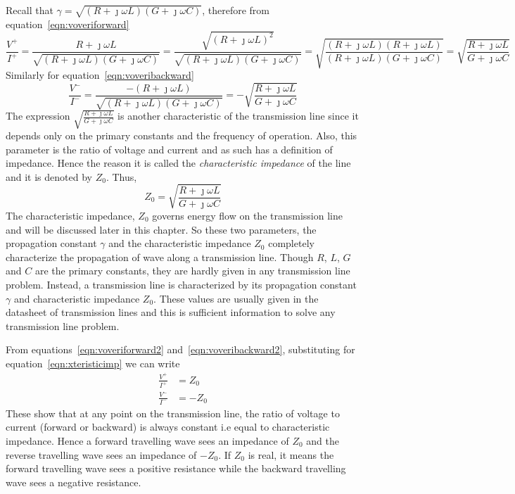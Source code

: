 Recall that $\gamma = \sqrt{(R + \jmath\omega L)(G + \jmath\omega C)}$, therefore from equation~\eqref{eqn:voveriforward}
\begin{dmath}
\frac{V^+}{I^+} = \frac{R+\jmath\omega L}{\sqrt{(R + \jmath\omega L)(G + \jmath\omega C)}}
= \frac{\sqrt{(R+\jmath\omega L)^2}}{\sqrt{(R + \jmath\omega L)(G + \jmath\omega C)}}
=\sqrt{\frac{(R+\jmath\omega L)(R+\jmath\omega L)}{(R + \jmath\omega L)(G + \jmath\omega C)}}
=\sqrt{\frac{R+\jmath\omega L}{G+\jmath\omega C}}
\label{eqn:voveriforward2}
\end{dmath}
Similarly for equation~\eqref{eqn:voveribackward}
\begin{dmath}
\frac{V^-}{I^-} = \frac{-(R+\jmath\omega L)}{\sqrt{(R + \jmath\omega L)(G + \jmath\omega C)}}
=-\sqrt{\frac{R+\jmath\omega L}{G+\jmath\omega C}}
\label{eqn:voveribackward2}
\end{dmath}
The expression $\sqrt{\frac{R+\jmath\omega L}{G+\jmath\omega C}}$ is another characteristic of the transmission line since it depends only on the primary constants and the frequency of operation. Also, this parameter is the ratio of voltage and current and as such has a definition of impedance. Hence the reason it is called the \emph{characteristic impedance} of the line and it is denoted by $Z_0$. Thus,
\begin{equation}
Z_0 = \sqrt{\frac{R+\jmath\omega L}{G+\jmath\omega C}}
\label{eqn:xteristicimp}
\end{equation}
The characteristic impedance, $Z_0$ governs energy flow on the transmission line and will be discussed later in this chapter. So these two parameters, the propagation constant $\gamma$ and the characteristic impedance $Z_0$ completely characterize the propagation of wave along a transmission line. Though $R$, $L$, $G$ and $C$ are the primary constants, they are hardly given in any transmission line problem. Instead, a transmission line is characterized by its propagation constant $\gamma$ and characteristic impedance $Z_0$. These values are usually given in the datasheet of transmission lines and this is sufficient information to solve any transmission line problem.

From equations~\eqref{eqn:voveriforward2} and~\eqref{eqn:voveribackward2}, substituting for equation~\eqref{eqn:xteristicimp} we can write
\begin{align}
\frac{V^+}{I^+} &= Z_0\\
\frac{V^-}{I^-} &= -Z_0
\end{align}
These show that at any point on the transmission line, the ratio of voltage to current (forward or backward) is always constant i.e equal to characteristic impedance. Hence a forward travelling wave sees an impedance of $Z_0$ and the reverse travelling wave sees an impedance of $-Z_0$. If $Z_0$ is real, it means the forward travelling wave sees a positive resistance while the backward travelling wave sees a negative resistance.

